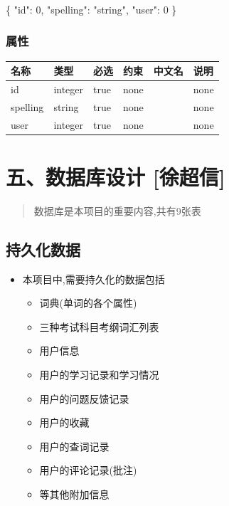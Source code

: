 \documentclass[
]{article}
\newenvironment{Shaded}{}{}
\newcommand{\DataTypeTok}[1]{\textcolor[rgb]{0.56,0.13,0.00}{#1}}
\newcommand{\DecValTok}[1]{\textcolor[rgb]{0.25,0.63,0.44}{#1}}
\newcommand{\FunctionTok}[1]{\textcolor[rgb]{0.02,0.16,0.49}{#1}}
\newcommand{\StringTok}[1]{\textcolor[rgb]{0.25,0.44,0.63}{#1}}
\begin{document}
\strut \\
\strut \\
\strut \\

\begin{Shaded}
\begin{Highlighting}[]
\FunctionTok{\{}
  \DataTypeTok{"id"}\FunctionTok{:} \DecValTok{0}\FunctionTok{,}
  \DataTypeTok{"spelling"}\FunctionTok{:} \StringTok{"string"}\FunctionTok{,}
  \DataTypeTok{"user"}\FunctionTok{:} \DecValTok{0}
\FunctionTok{\}}
\end{Highlighting}
\end{Shaded}

\hypertarget{ux5c5eux6027-19}{%
\subsubsection{属性}\label{ux5c5eux6027-19}}

\begin{longtable}[]{@{}llllll@{}}
\toprule
名称 & 类型 & 必选 & 约束 & 中文名 & 说明 \\
\midrule
\endhead
id & integer & true & none & & none \\
spelling & string & true & none & & none \\
user & integer & true & none & & none \\
\bottomrule
\end{longtable}

\hypertarget{ux4e94ux6570ux636eux5e93ux8bbeux8ba1-ux5f90ux8d85ux4fe1}{%
\section{五、数据库设计
{[}徐超信{]}}\label{ux4e94ux6570ux636eux5e93ux8bbeux8ba1-ux5f90ux8d85ux4fe1}}

\begin{quote}
数据库是本项目的重要内容,共有9张表
\end{quote}

\hypertarget{ux6301ux4e45ux5316ux6570ux636e}{%
\subsection{持久化数据}\label{ux6301ux4e45ux5316ux6570ux636e}}

\begin{itemize}
\item
  本项目中,需要持久化的数据包括

  \begin{itemize}
  \item
    词典(单词的各个属性)
  \item
    三种考试科目考纲词汇列表
  \item
    用户信息
  \item
    用户的学习记录和学习情况
  \item
    用户的问题反馈记录
  \item
    用户的收藏
  \item
    用户的查词记录
  \item
    用户的评论记录(批注)
  \item
    等其他附加信息
  \end{itemize}
\end{itemize}
\end{document}

